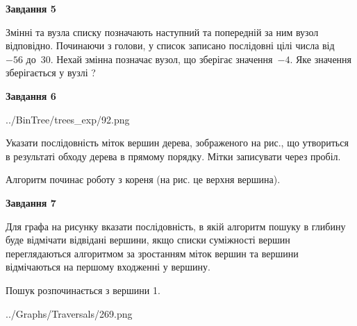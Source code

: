 \documentclass[12pt, ukrainian]{article}
\begin{document}
{\begin {large}
{\begin {center}\textbf{Завдання 5}\end {center}}\par
Змінні  та  вузла списку позначають наступний та попередній за ним вузол відповідно. Починаючи з голови, у список записано послідовні цілі числа від~$-56$ до~$30$. Нехай змінна  позначає вузол, що зберігає значення~$-4$.
Яке значення зберігається у вузлі  ?\par
\newpage

{\begin {center}\textbf{Завдання 6}\end {center}}\par

\begin{center}
	{../BinTree/trees_exp/92.png}
\end{center}
Указати послідовність міток вершин дерева, зображеного на рис., що утвориться в результаті обходу дерева в прямому порядку. Мітки записувати через пробіл.\par Алгоритм починає роботу з кореня (на рис. це верхня вершина).\par
\newpage

{\begin {center}\textbf{Завдання 7}\end {center}}\par
Для графа на рисунку вказати послідовність, в якій алгоритм пошуку в глибину буде відмічати відвідані вершини, якщо списки суміжності вершин переглядаються алгоритмом за зростанням міток вершин та вершини відмічаються на першому вход\-женні у вершину.\par
Пошук розпочинається з вершини 1.\par

\begin{center}
	{../Graphs/Traversals/269.png}
\end{center}\par
\newpage


\end{large}}
\end{document}
